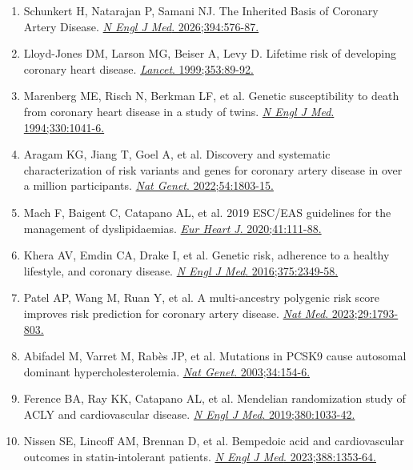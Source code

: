 \documentclass[12pt,a4paper]{article}
\begin{document}
\begin{enumerate}
    \item Schunkert H, Natarajan P, Samani NJ. The Inherited Basis of Coronary Artery Disease. \href{https://doi.org/10.1056/NEJMra2405153}{\textit{N Engl J Med}. 2026;394:576-87.}

    \item Lloyd-Jones DM, Larson MG, Beiser A, Levy D. Lifetime risk of developing coronary heart disease. \href{https://doi.org/10.1016/S0140-6736(99)80005-8}{\textit{Lancet}. 1999;353:89-92.}

    \item Marenberg ME, Risch N, Berkman LF, et al. Genetic susceptibility to death from coronary heart disease in a study of twins. \href{https://doi.org/10.1056/NEJM199404143301503}{\textit{N Engl J Med}. 1994;330:1041-6.}

    \item Aragam KG, Jiang T, Goel A, et al. Discovery and systematic characterization of risk variants and genes for coronary artery disease in over a million participants. \href{https://doi.org/10.1038/s41588-022-01233-6}{\textit{Nat Genet}. 2022;54:1803-15.}

    \item Mach F, Baigent C, Catapano AL, et al. 2019 ESC/EAS guidelines for the management of dyslipidaemias. \href{https://doi.org/10.1093/eurheartj/ehz455}{\textit{Eur Heart J}. 2020;41:111-88.}

    \item Khera AV, Emdin CA, Drake I, et al. Genetic risk, adherence to a healthy lifestyle, and coronary disease. \href{https://doi.org/10.1056/NEJMoa1605086}{\textit{N Engl J Med}. 2016;375:2349-58.}

    \item Patel AP, Wang M, Ruan Y, et al. A multi-ancestry polygenic risk score improves risk prediction for coronary artery disease. \href{https://doi.org/10.1038/s41591-023-02429-x}{\textit{Nat Med}. 2023;29:1793-803.}

    \item Abifadel M, Varret M, Rabès JP, et al. Mutations in PCSK9 cause autosomal dominant hypercholesterolemia. \href{https://doi.org/10.1038/ng1161}{\textit{Nat Genet}. 2003;34:154-6.}

    \item Ference BA, Ray KK, Catapano AL, et al. Mendelian randomization study of ACLY and cardiovascular disease. \href{https://doi.org/10.1056/NEJMoa1806747}{\textit{N Engl J Med}. 2019;380:1033-42.}

    \item Nissen SE, Lincoff AM, Brennan D, et al. Bempedoic acid and cardiovascular outcomes in statin-intolerant patients. \href{https://doi.org/10.1056/NEJMoa2215024}{\textit{N Engl J Med}. 2023;388:1353-64.}
\end{enumerate}
\end{document}
